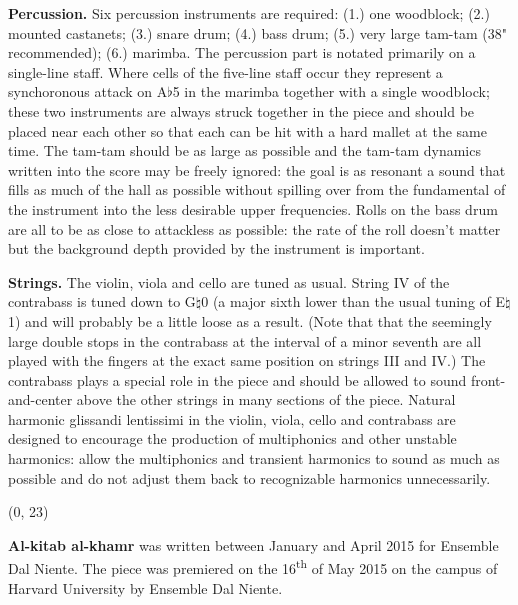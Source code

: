 \documentclass[10pt]{article}
\begin{document}
\begin{textblock}{23}
\textbf{Percussion.} Six percussion instruments are required: (1.) one
woodblock; (2.) mounted castanets; (3.) snare drum; (4.) bass drum; (5.) very
large tam-tam (38" recommended); (6.) marimba. The percussion part is notated
primarily on a single-line staff. Where cells of the five-line staff occur they
represent a synchoronous attack on A$\flat$5 in the marimba together with a
single woodblock; these two instruments are always struck together in the piece
and should be placed near each other so that each can be hit with a hard mallet
at the same time. The tam-tam should be as large as possible and the tam-tam
dynamics written into the score may be freely ignored: the goal is as resonant
a sound that fills as much of the hall as possible without spilling over from
the fundamental of the instrument into the less desirable upper frequencies.
Rolls on the bass drum are all to be as close to attackless as possible: the
rate of the roll doesn't matter but the background depth provided by the
instrument is important.

\textbf{Strings.} The violin, viola and cello are tuned as usual. String IV of
the contrabass is tuned down to G$\natural$0 (a major sixth lower than the
usual tuning of E$\natural$1) and will probably be a little loose as a result.
(Note that that the seemingly large double stops in the contrabass at the
interval of a minor seventh are all played with the fingers at the exact same
position on strings III and IV.) The contrabass plays a special role in the
piece and should be allowed to sound front-and-center above the other strings
in many sections of the piece. Natural harmonic glissandi lentissimi in the
violin, viola, cello and contrabass are designed to encourage the production of
multiphonics and other unstable harmonics: allow the multiphonics and transient
harmonics to sound as much as possible and do not adjust them back to
recognizable harmonics unnecessarily.

\end{textblock}

\begin{textblock}{23}(0, 23)

\textbf{Al-kitab al-khamr} was written between January and April 2015 for
Ensemble Dal Niente. The piece was premiered on the 16\textsuperscript{th} of
May 2015 on the campus of Harvard University by Ensemble Dal Niente.

\end{textblock}
\end{document}
